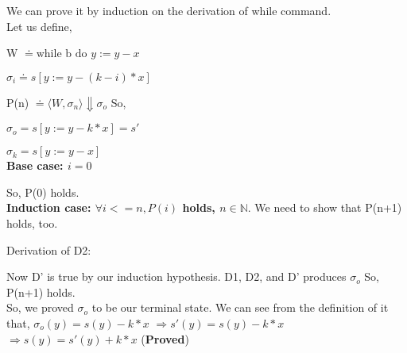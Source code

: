 \documentclass[a4paper, 11pt]{article}
\begin{document}
We can prove it by induction on the derivation of while command.\newline 
\\[1mm]
Let us define, 

W $\doteq \textrm{while b do } y := y-x $

$\sigma_i \doteq s[y := y -(k-i)*x]$

P(n) $\doteq \langle W, \sigma_n \rangle \Downarrow \sigma_o$ \newline
So,

$\sigma_o = s[y := y -k*x] = s'$

$\sigma_k = s[y := y -x]$ 
\\[5mm]
\textbf{Base case: $i = 0 $}
\begin{prooftree}

  
\end{prooftree} 
So, P(0) holds.
\\[5mm]
\textbf{Induction case: $\forall i <= n, P(i)$ holds, $n \in \mathbb{N}.$}\newline
We need to show that P(n+1) holds, too.

\begin{prooftree}
  
  
\end{prooftree}
Derivation of D2:
\begin{prooftree}
  
  
\end{prooftree}
Now D' is true by our induction hypothesis. D1, D2, and D' produces $\sigma_o$ So, P(n+1) holds. 
\\[5mm]
So, we proved $\sigma_o$ to be our terminal state. We can see from the definition of it that,
$\sigma_o(y) = s(y) - k*x $ \newline
$\Rightarrow s'(y) = s(y) - k*x $\newline
$\Rightarrow s(y) = s'(y) + k*x $ (\textbf{Proved})
\end{document}
